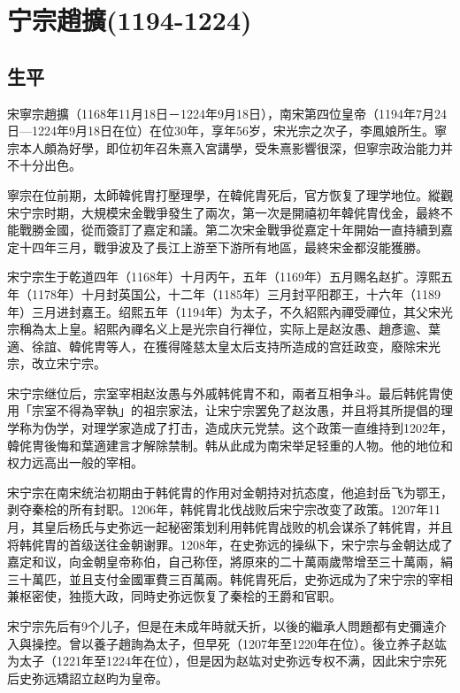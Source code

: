 
\section{宁宗趙擴\tiny(1194-1224)}

\subsection{生平}

宋寧宗趙擴（1168年11月18日－1224年9月18日），南宋第四位皇帝（1194年7月24日—1224年9月18日在位）在位30年，享年56岁，宋光宗之次子，李鳳娘所生。寧宗本人頗為好學，即位初年召朱熹入宮講學，受朱熹影響很深，但寧宗政治能力并不十分出色。

寧宗在位前期，太師韓侂胄打壓理學，在韓侂胄死后，官方恢复了理学地位。縱觀宋宁宗时期，大規模宋金戰爭發生了兩次，第一次是開禧初年韓侂胄伐金，最終不能戰勝金國，從而簽訂了嘉定和議。第二次宋金戰爭從嘉定十年開始一直持續到嘉定十四年三月，戰爭波及了長江上游至下游所有地區，最終宋金都沒能獲勝。

宋宁宗生于乾道四年（1168年）十月丙午，五年（1169年）五月赐名赵扩。淳熙五年（1178年）十月封英国公，十二年（1185年）三月封平阳郡王，十六年（1189年）三月进封嘉王。绍熙五年（1194年）为太子，不久紹熙內禪受禪位，其父宋光宗稱為太上皇。紹熙內禪名义上是光宗自行禅位，实际上是赵汝愚、趙彥逾、葉適、徐誼、韓侂冑等人，在獲得隆慈太皇太后支持所造成的宫廷政变，廢除宋光宗，改立宋宁宗。

宋宁宗继位后，宗室宰相赵汝愚与外戚韩侂胄不和，兩者互相争斗。最后韩侂胄使用「宗室不得為宰執」的祖宗家法，让宋宁宗罢免了赵汝愚，并且将其所提倡的理学称为伪学，对理学家造成了打击，造成庆元党禁。这个政策一直维持到1202年，韓侂冑後悔和葉適建言才解除禁制。韩从此成为南宋举足轻重的人物。他的地位和权力远高出一般的宰相。

宋宁宗在南宋统治初期由于韩侂胄的作用对金朝持对抗态度，他追封岳飞为鄂王，剥夺秦桧的所有封职。1206年，韩侂胄北伐战败后宋宁宗改变了政策。1207年11月，其皇后杨氏与史弥远一起秘密策划利用韩侂胄战败的机会谋杀了韩侂胄，并且将韩侂胄的首级送往金朝谢罪。1208年，在史弥远的操纵下，宋宁宗与金朝达成了嘉定和议，向金朝皇帝称伯，自己称侄，將原來的二十萬兩歲幣增至三十萬兩，絹三十萬匹，並且支付金國軍費三百萬兩。韩侂胄死后，史弥远成为了宋宁宗的宰相兼枢密使，独揽大政，同時史弥远恢复了秦桧的王爵和官职。

宋宁宗先后有9个儿子，但是在未成年時就夭折，以後的繼承人問題都有史彌遠介入與操控。曾以養子趙詢為太子，但早死（1207年至1220年在位）。後立养子赵竑为太子（1221年至1224年在位），但是因为赵竑对史弥远专权不满，因此宋宁宗死后史弥远矯詔立赵昀为皇帝。

